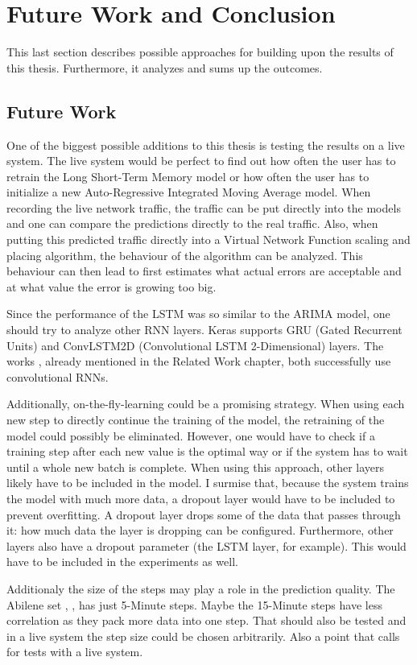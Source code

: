 \section{Future Work and Conclusion}
This last section describes possible approaches for building upon the results of this thesis.
Furthermore, it analyzes and sums up the outcomes. 
\subsection{Future Work}
One of the biggest possible additions to this thesis is testing the results on a live system.
The live system would be perfect to find out how often the user has to retrain the Long Short-Term Memory model or how often the user has to initialize a new Auto-Regressive Integrated Moving Average model.
When recording the live network traffic, the traffic can be put directly into the models and one can compare the predictions directly to the real traffic.
Also, when putting this predicted traffic directly into a Virtual Network Function scaling and placing algorithm, the behaviour of the algorithm can be analyzed.
This behaviour can then lead to first estimates what actual errors are acceptable and at what value the error is growing too big.

Since the performance of the LSTM was so similar to the ARIMA model, one should try to analyze other RNN layers.
Keras supports GRU (Gated Recurrent Units) and ConvLSTM2D (Convolutional LSTM 2-Dimensional) layers.
The works \cite{8717800} \cite{8292737}, already mentioned in the Related Work chapter, both successfully use convolutional RNNs.

Additionally, on-the-fly-learning could be a promising strategy.
When using each new step to directly continue the training of the model, the retraining of the model could possibly be eliminated.
However, one would have to check if a training step after each new value is the optimal way or if the system has to wait until a whole new batch is complete.
When using this approach, other layers likely have to be included in the model.
I surmise that, because the system trains the model with much more data, a dropout layer would have to be included to prevent overfitting.
A dropout layer drops some of the data that passes through it: how much data the layer is dropping can be configured.
Furthermore, other layers also have a dropout parameter (the LSTM layer, for example).
This would have to be included in the experiments as well.

Additionaly the size of the steps may play a role in the prediction quality.
The Abilene set \cite{SNDlib10}, \cite{OrlowskiPioroTomaszewskiWessaely2010}, has just 5-Minute steps.
Maybe the 15-Minute steps have less correlation as they pack more data into one step.
That should also be tested and in a live system the step size could be chosen arbitrarily.
Also a point that calls for tests with a live system.


